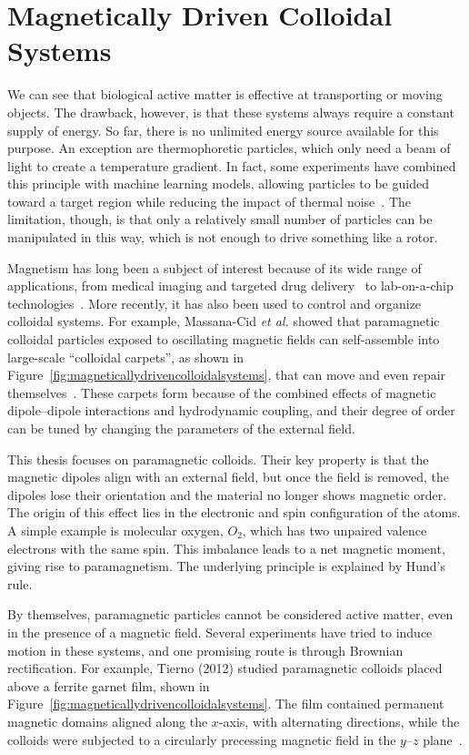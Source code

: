 \chapter{Magnetically Driven Colloidal Systems}
\label{magneticallydrivencolloidalsystems}


We can see that biological active matter is effective at transporting or moving objects. The drawback, however, is that these systems always require a constant supply of energy. So far, there is no unlimited energy source available for this purpose. An exception are thermophoretic particles, which only need a beam of light to create a temperature gradient. In fact, some experiments have combined this principle with machine learning models, allowing particles to be guided toward a target region while reducing the impact of thermal noise~\cite{muinos2021reinforcement}. The limitation, though, is that only a relatively small number of particles can be manipulated in this way, which is not enough to drive something like a rotor.

Magnetism has long been a subject of interest because of its wide range of applications, from medical imaging and targeted drug delivery~\cite{geva2006magnetic, matthews2004functional, corti2011imaging} to lab-on-a-chip technologies~\cite{pamme2006magnetism}. More recently, it has also been used to control and organize colloidal systems. For example, Massana-Cid \textit{et al.} showed that paramagnetic colloidal particles exposed to oscillating magnetic fields can self-assemble into large-scale “colloidal carpets”, as shown in Figure~\ref{fig:magneticallydrivencolloidalsystems}, that can move and even repair themselves~\cite{massana2019tunable}. These carpets form because of the combined effects of magnetic dipole–dipole interactions and hydrodynamic coupling, and their degree of order can be tuned by changing the parameters of the external field.

This thesis focuses on paramagnetic colloids. Their key property is that the magnetic dipoles align with an external field, but once the field is removed, the dipoles lose their orientation and the material no longer shows magnetic order. The origin of this effect lies in the electronic and spin configuration of the atoms. A simple example is molecular oxygen, $O_2$, which has two unpaired valence electrons with the same spin. This imbalance leads to a net magnetic moment, giving rise to paramagnetism. The underlying principle is explained by Hund’s rule.

By themselves, paramagnetic particles cannot be considered active matter, even in the presence of a magnetic field. Several experiments have tried to induce motion in these systems, and one promising route is through Brownian rectification. For example, Tierno (2012) studied paramagnetic colloids placed above a ferrite garnet film, shown in Figure~\ref{fig:magneticallydrivencolloidalsystems}. The film contained permanent magnetic domains aligned along the $x$-axis, with alternating directions, while the colloids were subjected to a circularly precessing magnetic field in the $y$–$z$ plane~\cite{tierno2012depinning}.


